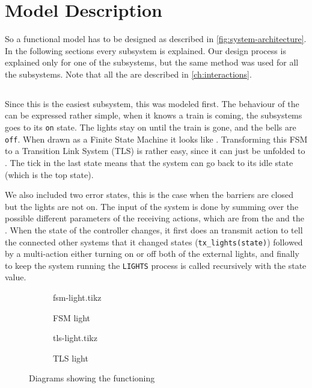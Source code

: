 \documentclass[final]{report}
\begin{document}
\chapter{Model Description}
So a functional model has to be designed as described in \cref{fig:system-architecture}.
In the following sections every subsystem is explained.
Our design process is explained only for one of the subsystems, but the same method was used for all the subsystems.
Note that all the  are described in \cref{ch:interactions}.


\section{}
Since this is the easiest subsystem, this was modeled first.
The behaviour of the  can be expressed rather simple, when it knows a train is coming, the subsystems goes to its \texttt{on} state.
The lights stay on until the train is gone, and the bells are \texttt{off}.
When drawn as a Finite State Machine it looks like \label{fig:fsm-light-model}.
Transforming this FSM to a Transition Link System (TLS) is rather easy, since it can just be unfolded to \label{fig:tls-light-model}.
The tick in the last state means that the system can go back to its idle state (which is the top state).

We also included two error states, this is the case when the barriers are closed but the lights are not on.
The input of the system is done by summing over the possible different parameters of the receiving actions, which are from the  and the .
When the state of the controller changes, it first does an transmit action to tell the connected other systems that it changed states (\texttt{tx\_lights(state)}) followed by a multi-action either turning on or off both of the external lights, and finally to keep the system running the \texttt{LIGHTS} process is called recursively with the state value.

\begin{figure}[H]
    \centering
        \begin{subfigure}[b]{0.4\textwidth}
    \centering
            {fsm-light.tikz}
            \caption{FSM light}
            \label{fig:fsm-light-model}
        \end{subfigure}
        \begin{subfigure}[b]{0.4\textwidth}
    \centering
            {tls-light.tikz}
            \caption{TLS light}
            \label{fig:tls-light-model}
        \end{subfigure}
    \caption{Diagrams showing the functioning }
    \label{fig:light}
\end{figure}
\end{document}
